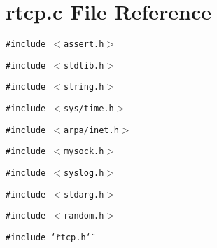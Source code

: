 \section{rtcp.c File Reference}
\label{rtcp_8c}
{\tt \#include $<$assert.h$>$}\par
{\tt \#include $<$stdlib.h$>$}\par
{\tt \#include $<$string.h$>$}\par
{\tt \#include $<$sys/time.h$>$}\par
{\tt \#include $<$arpa/inet.h$>$}\par
{\tt \#include $<$mysock.h$>$}\par
{\tt \#include $<$syslog.h$>$}\par
{\tt \#include $<$stdarg.h$>$}\par
{\tt \#include $<$random.h$>$}\par
{\tt \#include \char`\"{}rtcp.h\char`\"{}}\par
